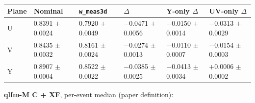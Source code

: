\documentclass[10pt,a4paper]{article}
\begin{document}
\begin{center}\footnotesize
\setlength{\tabcolsep}{3pt}\renewcommand{\arraystretch}{1.15}
\begin{tabularx}{\linewidth}{LLLLLL}
\toprule
\textbf{Plane} & \textbf{Nominal} & \textbf{\texttt{w\_\allowbreak{}meas3d}} & \textbf{$\Delta$} & \textbf{Y-only $\Delta$} & \textbf{UV-only $\Delta$} \\
\midrule
U & 0.8391 $\pm$ 0.0024 & 0.7920 $\pm$ 0.0049 & $-$0.0471 $\pm$ 0.0056 & $-$0.0150 $\pm$ 0.0014 & $-$0.0313 $\pm$ 0.0029 \\
V & 0.8435 $\pm$ 0.0032 & 0.8161 $\pm$ 0.0024 & $-$0.0274 $\pm$ 0.0013 & $-$0.0110 $\pm$ 0.0007 & $-$0.0154 $\pm$ 0.0003 \\
Y & 0.8907 $\pm$ 0.0004 & 0.8522 $\pm$ 0.0022 & $-$0.0385 $\pm$ 0.0025 & $-$0.0413 $\pm$ 0.0034 & +0.0006 $\pm$ 0.0002 \\
\bottomrule
\end{tabularx}
\end{center}
\textbf{qlfm-M C + XF}, per-event median (paper definition):
\end{document}
